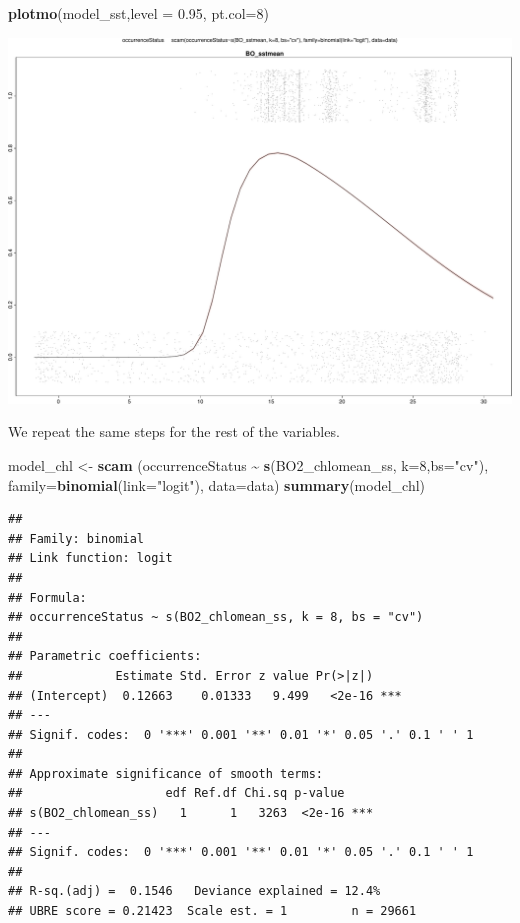\documentclass[
]{book}
\newenvironment{Shaded}{\begin{snugshade}}{\end{snugshade}}
\newcommand{\AttributeTok}[1]{\textcolor[rgb]{0.13,0.29,0.53}{#1}}
\newcommand{\DecValTok}[1]{\textcolor[rgb]{0.00,0.00,0.81}{#1}}
\newcommand{\FloatTok}[1]{\textcolor[rgb]{0.00,0.00,0.81}{#1}}
\newcommand{\FunctionTok}[1]{\textcolor[rgb]{0.13,0.29,0.53}{\textbf{#1}}}
\newcommand{\NormalTok}[1]{#1}
\newcommand{\OtherTok}[1]{\textcolor[rgb]{0.56,0.35,0.01}{#1}}
\newcommand{\SpecialCharTok}[1]{\textcolor[rgb]{0.81,0.36,0.00}{\textbf{#1}}}
\newcommand{\StringTok}[1]{\textcolor[rgb]{0.31,0.60,0.02}{#1}}
\begin{document}
\begin{Shaded}
\begin{Highlighting}[]
\FunctionTok{plotmo}\NormalTok{(model\_sst,}\AttributeTok{level =} \FloatTok{0.95}\NormalTok{, }\AttributeTok{pt.col=}\DecValTok{8}\NormalTok{)}
\end{Highlighting}
\end{Shaded}

\includegraphics{_main_files/figure-latex/unnamed-chunk-60-1.pdf}

We repeat the same steps for the rest of the variables.

\begin{Shaded}
\begin{Highlighting}[]
\NormalTok{model\_chl }\OtherTok{\textless{}{-}} \FunctionTok{scam}\NormalTok{ (occurrenceStatus }\SpecialCharTok{\textasciitilde{}}  \FunctionTok{s}\NormalTok{(BO2\_chlomean\_ss, }\AttributeTok{k=}\DecValTok{8}\NormalTok{,}\AttributeTok{bs=}\StringTok{"cv"}\NormalTok{), }\AttributeTok{family=}\FunctionTok{binomial}\NormalTok{(}\AttributeTok{link=}\StringTok{"logit"}\NormalTok{), }\AttributeTok{data=}\NormalTok{data)}
\FunctionTok{summary}\NormalTok{(model\_chl)}
\end{Highlighting}
\end{Shaded}

\begin{verbatim}
## 
## Family: binomial 
## Link function: logit 
## 
## Formula:
## occurrenceStatus ~ s(BO2_chlomean_ss, k = 8, bs = "cv")
## 
## Parametric coefficients:
##             Estimate Std. Error z value Pr(>|z|)    
## (Intercept)  0.12663    0.01333   9.499   <2e-16 ***
## ---
## Signif. codes:  0 '***' 0.001 '**' 0.01 '*' 0.05 '.' 0.1 ' ' 1
## 
## Approximate significance of smooth terms:
##                    edf Ref.df Chi.sq p-value    
## s(BO2_chlomean_ss)   1      1   3263  <2e-16 ***
## ---
## Signif. codes:  0 '***' 0.001 '**' 0.01 '*' 0.05 '.' 0.1 ' ' 1
## 
## R-sq.(adj) =  0.1546   Deviance explained = 12.4%
## UBRE score = 0.21423  Scale est. = 1         n = 29661
\end{verbatim}
\end{document}
